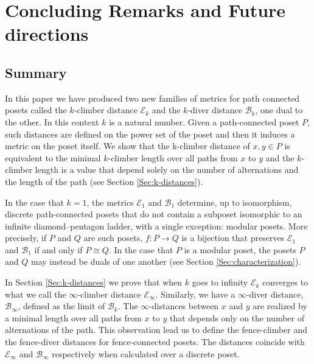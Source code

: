 \documentclass{article}[12pt]
\theoremstyle{exampstyle}
\theoremstyle{remark}
\newcommand{\B}{\mathcal{B}}
\newcommand{\E}{\mathcal{E}}
\begin{document}
 
   









\section{Concluding Remarks and Future directions}
\label{Sec:concluding}

\subsection{Summary}

In this paper we have produced two new families of metrics for path connected posets called the $k$-climber distance $\E_k$ and the $k$-diver distance $\B_k$, one dual to the other.  In this context $k$ is a natural number. Given a path-connected poset $P$, such distances are defined on the power set of the poset and then it induces a metric on the poset itself. We show that the k-climber distance of $x,y \in P$ is equivalent to the minimal $k$-climber length over all paths from $x$ to $y$ and the $k$-climber length is a value that depend solely on the number of alternations and the length of the path (see Section \ref{Sec:k-distances}). 

In the case that $k=1$, the metrics $\E_1$ and $\B_1$ determine, up to isomorphism, discrete path-connected posets that do not contain a subposet isomorphic to an infinite diamond–pentagon ladder, with a single exception: modular posets. More precisely, if $P$ and $Q$ are such posets, $f:P \to Q$ is a bijection that preserves $\E_1$ and $\B_1$ if and only if $P \cong Q$. In the case that $P$ is a modular poset, the posets $P$ and $Q$  may instead be duals of one another (see Section \ref{Sec:characterization}).

In Section \ref{Sec:k-distances} we prove that when $k$ goes to infinity $\E_k$ converges to what we call the $\infty$-climber distance  $\E_\infty$. Similarly, we have a $\infty$-diver distance, $\B_\infty$, defined as the limit of $\B_k$. The $\infty$-distances between $x$ and $y$ are realized by a minimal length over all paths from $x$ to $y$ that depends only on the number of alternations of the path. This observation lead us to define the fence-climber and the fence-diver distances for fence-connected posets. The distances coincide with $\E_\infty$ and $\B_\infty$ respectively when calculated over a discrete poset. 
\end{document}
